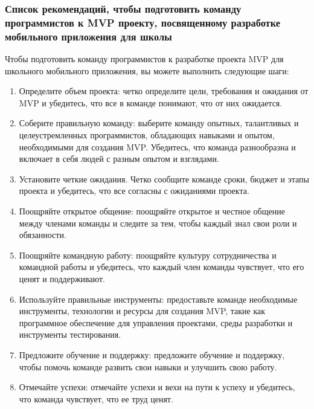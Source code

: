 \documentclass[letterpaper,10pt,russian]{sphinxmanual}
\begin{document}
\subsubsection{Список рекомендаций, чтобы подготовить команду программистов к MVP проекту, посвященному разработке мобильного приложения для школы}
\label{\detokenize{educational_materials/mvp/content:id7}}
\sphinxAtStartPar
Чтобы подготовить команду программистов к разработке проекта MVP для школьного мобильного приложения, вы можете выполнить следующие шаги:
\begin{enumerate}
%
\item {} 
\sphinxAtStartPar
Определите объем проекта: четко определите цели, требования и ожидания от MVP и убедитесь, что все в команде понимают, что от них ожидается.

\item {} 
\sphinxAtStartPar
Соберите правильную команду: выберите команду опытных, талантливых и целеустремленных программистов, обладающих навыками и опытом, необходимыми для создания MVP. Убедитесь, что команда разнообразна и включает в себя людей с разным опытом и взглядами.

\item {} 
\sphinxAtStartPar
Установите четкие ожидания. Четко сообщите команде сроки, бюджет и этапы проекта и убедитесь, что все согласны с ожиданиями проекта.

\item {} 
\sphinxAtStartPar
Поощряйте открытое общение: поощряйте открытое и честное общение между членами команды и следите за тем, чтобы каждый знал свои роли и обязанности.

\item {} 
\sphinxAtStartPar
Поощряйте командную работу: поощряйте культуру сотрудничества и командной работы и убедитесь, что каждый член команды чувствует, что его ценят и поддерживают.

\item {} 
\sphinxAtStartPar
Используйте правильные инструменты: предоставьте команде необходимые инструменты, технологии и ресурсы для создания MVP, такие как программное обеспечение для управления проектами, среды разработки и инструменты тестирования.

\item {} 
\sphinxAtStartPar
Предложите обучение и поддержку: предложите обучение и поддержку, чтобы помочь команде развить свои навыки и улучшить свою работу.

\item {} 
\sphinxAtStartPar
Отмечайте успехи: отмечайте успехи и вехи на пути к успеху и убедитесь, что команда чувствует, что ее труд ценят.

\end{enumerate}
\end{document}
